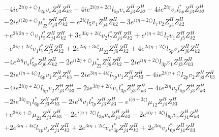 \begin{align}
 &-4 i e^{2 i \Big(\eta +\zeta \Big)} l_{2p} v_s Z_{{j 3}}^{H} Z_{{k 2}}^{H} -4 i e^{2 i \Big(\eta +2 \zeta \Big)} l_{5p} v_s Z_{{j 3}}^{H} Z_{{k 2}}^{H} -4 i e^{2 i \eta } v_s l_{5p}^* Z_{{j 3}}^{H} Z_{{k 2}}^{H} \nonumber \\ 
 &-2 i e^{i \Big(2 \eta +\zeta \Big)} \mu_{22}^* Z_{{j 3}}^{H} Z_{{k 2}}^{H} - e^{2 i \zeta } l_5 v_1 Z_{{j 4}}^{H} Z_{{k 2}}^{H} -3 e^{i \Big(\eta +2 \zeta \Big)} l_7 v_2 Z_{{j 4}}^{H} Z_{{k 2}}^{H} \nonumber \\ 
 &+e^{2 i \Big(2 \eta +\zeta \Big)} v_1 l_5^* Z_{{j 4}}^{H} Z_{{k 2}}^{H} +3 e^{3 i \eta +2 i \zeta } v_2 l_7^* Z_{{j 4}}^{H} Z_{{k 2}}^{H} +e^{i \Big(\eta +2 \zeta \Big)} l_7 v_1 Z_{{j 5}}^{H} Z_{{k 2}}^{H} \nonumber \\ 
 &- e^{3 i \eta +2 i \zeta } v_1 l_7^* Z_{{j 5}}^{H} Z_{{k 2}}^{H} +2 e^{2 i \eta +3 i \zeta } \mu_{22} Z_{{j 6}}^{H} Z_{{k 2}}^{H} +4 e^{2 i \Big(\eta +2 \zeta \Big)} l_{5p} v_s Z_{{j 6}}^{H} Z_{{k 2}}^{H} \nonumber \\ 
 &-4 e^{2 i \eta } v_s l_{5p}^* Z_{{j 6}}^{H} Z_{{k 2}}^{H} -2 e^{i \Big(2 \eta +\zeta \Big)} \mu_{22}^* Z_{{j 6}}^{H} Z_{{k 2}}^{H} -2 i e^{i \Big(\eta +2 \zeta \Big)} l_{3p} v_1 Z_{{j 3}}^{H} Z_{{k 3}}^{H} \nonumber \\ 
 &-2 i e^{i \Big(\eta +4 \zeta \Big)} l_{6p} v_1 Z_{{j 3}}^{H} Z_{{k 3}}^{H} -2 i e^{3 i \eta +4 i \zeta } l_{7p} v_1 Z_{{j 3}}^{H} Z_{{k 3}}^{H} -4 i e^{2 i \Big(\eta +\zeta \Big)} l_{2p} v_2 Z_{{j 3}}^{H} Z_{{k 3}}^{H} \nonumber \\ 
 &-4 i e^{2 i \Big(\eta +2 \zeta \Big)} l_{5p} v_2 Z_{{j 3}}^{H} Z_{{k 3}}^{H} -2 i e^{3 i \eta +2 i \zeta } v_1 l_{3p}^* Z_{{j 3}}^{H} Z_{{k 3}}^{H} -4 i e^{2 i \eta } v_2 l_{5p}^* Z_{{j 3}}^{H} Z_{{k 3}}^{H} \nonumber \\ 
 &-2 i e^{3 i \eta } v_1 l_{6p}^* Z_{{j 3}}^{H} Z_{{k 3}}^{H} -2 i e^{i \eta } v_1 l_{7p}^* Z_{{j 3}}^{H} Z_{{k 3}}^{H} - e^{i \Big(\eta +3 \zeta \Big)} \mu_{12} Z_{{j 4}}^{H} Z_{{k 3}}^{H} \nonumber \\ 
 &+e^{3 i \Big(\eta +\zeta \Big)} \mu_{21} Z_{{j 4}}^{H} Z_{{k 3}}^{H} -2 e^{i \Big(\eta +2 \zeta \Big)} l_{3p} v_s Z_{{j 4}}^{H} Z_{{k 3}}^{H} -2 e^{i \Big(\eta +4 \zeta \Big)} l_{6p} v_s Z_{{j 4}}^{H} Z_{{k 3}}^{H} \nonumber \\ 
 &+2 e^{3 i \eta +4 i \zeta } l_{7p} v_s Z_{{j 4}}^{H} Z_{{k 3}}^{H} +2 e^{3 i \eta +2 i \zeta } v_s l_{3p}^* Z_{{j 4}}^{H} Z_{{k 3}}^{H} +2 e^{3 i \eta } v_s l_{6p}^* Z_{{j 4}}^{H} Z_{{k 3}}^{H} \nonumber \\ 

\end{align}
